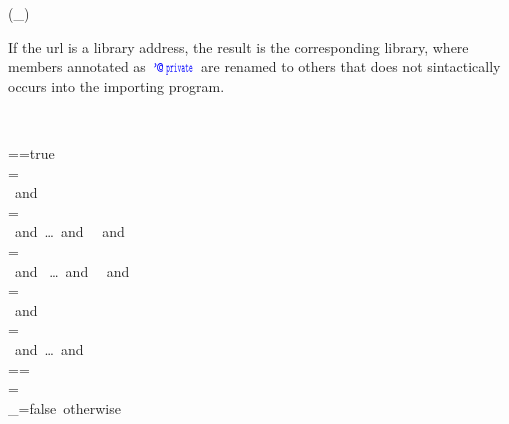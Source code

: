 \begin{MDefinition}{(\_)}
\parbox{0.95\linewidth}{
If the url is a library address, the result is the corresponding library, where members annotated as $\Terminale{'\!@}\Kw{private}$
are renamed to others that does not sintactically occurs into the importing program.
}
\end{MDefinition}
\\
\begin{MDefinition}{\SyntaxFlow{\_}}

\SyntaxFlow{\L\, \e}=\SyntaxFlow{\loopKw\,\e}=\mbox{true}\\

\SyntaxFlow{\ifKw\,\_\,\e\,\elseKw\, \block}=
\\\quad
\SyntaxFlow{\e }\mbox{ and }\SyntaxFlow{\block }\\

=
\\\quad
\mbox{ and }\ldots\mbox{ and } \mbox{ and }\SyntaxFlow\e\\

=
\\\quad
\mbox{ and } \ldots\mbox{ and } 
\mbox{ and }\\

=
\\\quad
\SyntaxFlow{\catchKw\,\L\,\x\oRound\docs
\ons}\mbox{ and }\SyntaxFlow\e\\

=
\\\quad
{}\mbox{ and }\ldots\mbox{ and }\\
\SyntaxFlow{\ifKw\,\_\,\e}=\SyntaxFlow{\with\xs\es\e}=
\\\quad
\SyntaxFlow{\es\e}=\SyntaxFlow{\e}\\
\SyntaxFlow\_=\mbox{false otherwise}

\end{MDefinition}